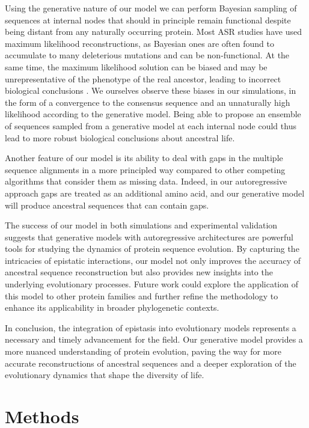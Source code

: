 Using the generative nature of our model we can perform Bayesian sampling of sequences at internal nodes that should in principle remain functional despite being distant from any naturally occurring protein.
Most ASR studies have used maximum likelihood reconstructions, as Bayesian ones are often found to accumulate to many deleterious mutations and can be non-functional. 
At the same time, the maximum likelihood solution can be biased and may be unrepresentative of the phenotype of the real ancestor, leading to incorrect biological conclusions \cite{williams_assessingaccuracyancestral_2006,wheeler_thermostabilityspecificityancient_2016}. 
We ourselves observe these biases in our simulations, in the form of a convergence to the consensus sequence and an unnaturally high likelihood according to the generative model. 
Being able to propose an ensemble of sequences sampled from a generative model at each internal node could thus lead to more robust biological conclusions about ancestral life. 

Another feature of our model is its ability to deal with gaps in the multiple sequence alignments in a more principled way compared to other competing algorithms that consider them as missing data. 
Indeed, in our autoregressive approach gaps are treated as an additional amino acid, and our generative model will produce ancestral sequences that can contain gaps.

The success of our model in both simulations and experimental validation suggests that generative models with autoregressive architectures are powerful tools for studying the dynamics of protein sequence evolution. 
By capturing the intricacies of epistatic interactions, our model not only improves the accuracy of ancestral sequence reconstruction but also provides new insights into the underlying evolutionary processes. 
Future work could explore the application of this model to other protein families and further refine the methodology to enhance its applicability in broader phylogenetic contexts.

In conclusion, the integration of epistasis into evolutionary models represents a necessary and timely advancement for the field. 
Our generative model provides a more nuanced understanding of protein evolution, paving the way for more accurate reconstructions of ancestral sequences and a deeper exploration of the evolutionary dynamics that shape the diversity of life.


\section{Methods} %
\label{sub:methods}

